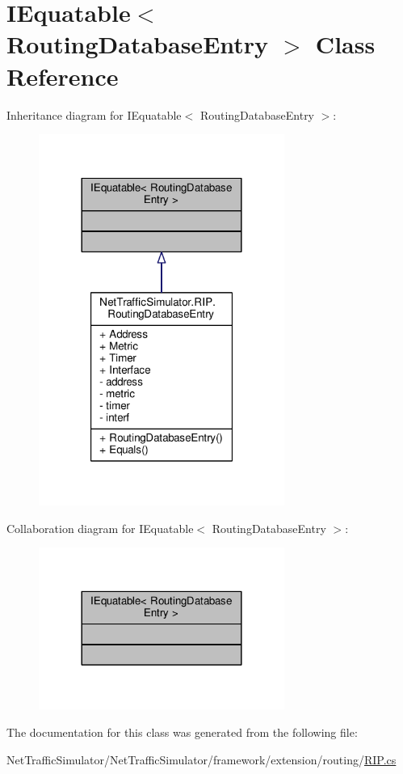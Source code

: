 \hypertarget{classIEquatable_3_01RoutingDatabaseEntry_01_4}{\section{I\-Equatable$<$ Routing\-Database\-Entry $>$ Class Reference}
\label{classIEquatable_3_01RoutingDatabaseEntry_01_4}
}


Inheritance diagram for I\-Equatable$<$ Routing\-Database\-Entry $>$\-:\nopagebreak
\begin{figure}[H]
\begin{center}
\leavevmode
\includegraphics[width=228pt]{classIEquatable_3_01RoutingDatabaseEntry_01_4__inherit__graph}
\end{center}
\end{figure}


Collaboration diagram for I\-Equatable$<$ Routing\-Database\-Entry $>$\-:\nopagebreak
\begin{figure}[H]
\begin{center}
\leavevmode
\includegraphics[width=228pt]{classIEquatable_3_01RoutingDatabaseEntry_01_4__coll__graph}
\end{center}
\end{figure}


The documentation for this class was generated from the following file\-:\begin{DoxyCompactItemize}
\item 
Net\-Traffic\-Simulator/\-Net\-Traffic\-Simulator/framework/extension/routing/\hyperlink{RIP_8cs}{R\-I\-P.\-cs}\end{DoxyCompactItemize}
